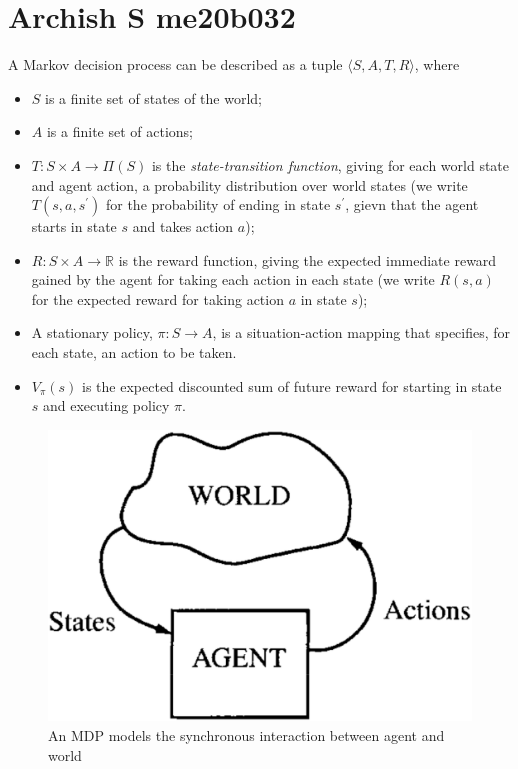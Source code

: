 \section{Archish S me20b032}
A Markov decision process can be described as a tuple $ \langle S, A, T, R \rangle $, where
\begin{itemize}
	\item $S$ is a finite set of states of the world;
	\item $A$ is a finite set of actions;
	\item $T : S \times A \rightarrow \Pi(S)$ is the \textit{state-transition function}, giving for each world state and agent action, a probability distribution over world states (we write $T(s,a,s^\prime)$ for the probability of ending in state $s^\prime$, gievn that the agent starts in state $s$ and takes action $a$);
	\item $R : S \times A \rightarrow \mathbb{R}$ is the reward function, giving the expected immediate reward gained by the agent for taking each action in each state (we write $R(s,a)$ for the expected reward for taking action $a$ in state $s$);
	\item A stationary policy, $ \pi : S \rightarrow A $, is a situation-action mapping that specifies, for each state, an action to be taken.
	\item $V_{\pi}(s)$ is the expected discounted sum of future reward for starting in state $s$ and executing policy $\pi$.
\end{itemize}

\begin{center}
\begin{figure}[h]
	\includegraphics[width=\linewidth]{me20b032/me20b032.eps}
  	\caption{An MDP models the synchronous interaction between agent and world}
	\label{fig:MDP}
\end{figure}
\end{center}

